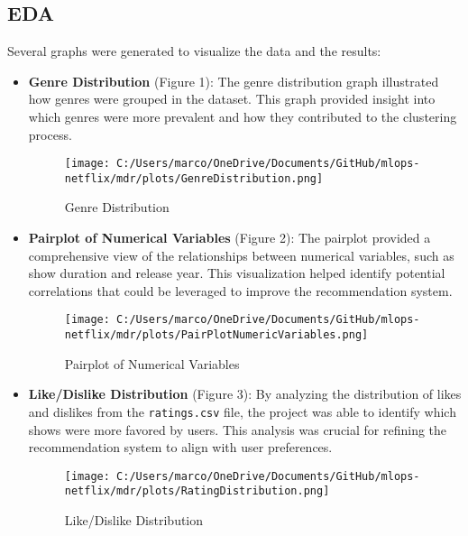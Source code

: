 \documentclass[sigconf]{acmart}
\begin{document}
	\subsection{EDA}
	Several graphs were generated to visualize the data and the results:
	\begin{itemize}
		\item \textbf{Genre Distribution} (Figure 1): The genre distribution graph illustrated how genres were grouped in the dataset. This graph provided insight into which genres were more prevalent and how they contributed to the clustering process.
		\begin{figure}[H]
			\centering
			\texttt{[image: C:/Users/marco/OneDrive/Documents/GitHub/mlops-netflix/mdr/plots/GenreDistribution.png]}
			\caption{Genre Distribution}
			\label{fig:genre_distribution}
		\end{figure}
		\FloatBarrier
		\item \textbf{Pairplot of Numerical Variables} (Figure 2): The pairplot provided a comprehensive view of the relationships between numerical variables, such as show duration and release year. This visualization helped identify potential correlations that could be leveraged to improve the recommendation system.
		\begin{figure}[H]
			\centering
			\texttt{[image: C:/Users/marco/OneDrive/Documents/GitHub/mlops-netflix/mdr/plots/PairPlotNumericVariables.png]}
			\caption{Pairplot of Numerical Variables}
			\label{fig:Pairplot}
		\end{figure}
		\FloatBarrier
		\item \textbf{Like/Dislike Distribution} (Figure 3): By analyzing the distribution of likes and dislikes from the \texttt{ratings.csv} file, the project was able to identify which shows were more favored by users. This analysis was crucial for refining the recommendation system to align with user preferences.
	 	\begin{figure}[H]
		\centering
		\texttt{[image: C:/Users/marco/OneDrive/Documents/GitHub/mlops-netflix/mdr/plots/RatingDistribution.png]}
		\caption{Like/Dislike Distribution}
		\label{fig:RatingDistribution}
		\end{figure}
		\FloatBarrier
	\end{itemize}
\end{document}
